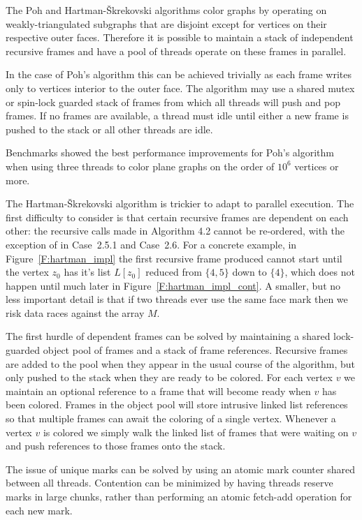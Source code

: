 \documentclass[12pt,letterpaper]{article}
\theoremstyle{plain}
\theoremstyle{definition}
\theoremstyle{break}
\begin{document}
The Poh and Hartman-\v{S}krekovski algorithms color graphs by operating on
weakly-triangulated subgraphs that are disjoint except for vertices on their
respective outer faces. Therefore it is possible to maintain a stack of
independent recursive frames and have a pool of threads operate on these frames
in parallel.

In the case of Poh's algorithm this can be achieved trivially as each
frame writes only to vertices interior to the outer face. The
algorithm may use a shared mutex or spin-lock guarded stack of frames from
which all threads will push and pop frames.
If no frames are
available, a thread must idle until either a new frame is pushed to the stack or
all other threads are idle.

Benchmarks showed the best performance improvements for Poh's algorithm when
using three threads to color plane graphs on the order of $10^6$ vertices
or more. 

The Hartman-\v{S}krekovski algorithm is trickier to adapt to
parallel execution. The first difficulty to consider is that certain recursive
frames are
dependent on each other: the recursive calls made in
Algorithm 4.2 cannot be re-ordered, with the exception of
in Case~2.5.1 and Case~2.6. For a concrete example,
in Figure~\ref{F:hartman_impl} the first recursive
frame produced cannot start until the vertex $z_0$ has it's list $L[z_0]$
reduced from $\{4,5\}$ down to $\{4\}$, which does not happen
until much later in Figure~\ref{F:hartman_impl_cont}. A smaller, but no less important detail is that
if two threads ever use the
same face mark then we risk data races against the array $M$.

The first hurdle of dependent frames can be solved by maintaining a shared
lock-guarded object pool
of frames and a stack of frame references. Recursive frames are added to the
pool when they appear in the usual course of the algorithm, but
only pushed to the stack when they
are ready to be colored. For each vertex $v$ we maintain an optional reference
to a frame that will become ready when $v$ has been colored. Frames in the
object pool will store intrusive linked list references so that multiple frames
can await the coloring of a single vertex. Whenever a vertex $v$ is
colored we simply walk the linked list of frames that were waiting on $v$
and push references to those frames onto the stack.

The issue of unique marks can be solved by using an atomic mark counter
shared between all threads. Contention can be minimized by having
threads reserve marks in large chunks, rather than performing an
atomic fetch-add operation for each new mark.
\end{document}
